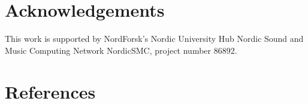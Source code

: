 \documentclass[twoside,a4paper, dvipsnames]{article}
\title{\papertitle}
\newif\ifpdf
\begin{document}
\ifpdf %
  \DeclareGraphicsExtensions{.png,.jpg,.pdf, eps.}
\else  %
\fi


\maketitle

\begin{abstract}
  
  \end{abstract}
  
  
  
  
  
  
  
\section{Acknowledgements}
This work is supported by NordForsk's Nordic
University Hub Nordic Sound and Music Computing Network
NordicSMC, project number 86892.
\nocite{*}

{\section{References}
{%
}
}
\end{document}

